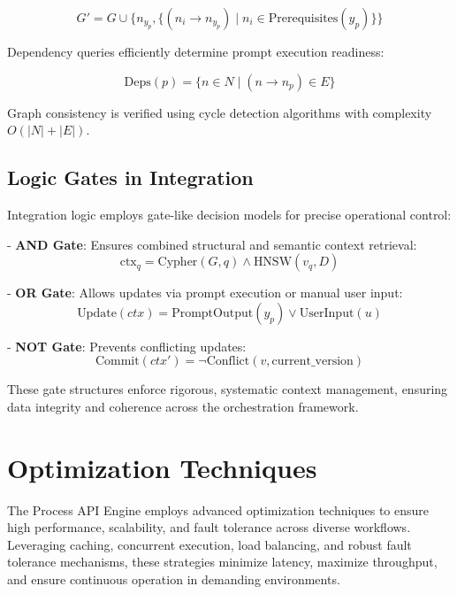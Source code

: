 \documentclass[11pt,a4paper]{article}
\begin{document}
\[
G'=G\cup\{n_{y_p},\{(n_i\rightarrow n_{y_p})\mid n_i\in\text{Prerequisites}(y_p)\}\}
\]

Dependency queries efficiently determine prompt execution readiness:

\[
\text{Deps}(p)=\{n\in N\mid(n\rightarrow n_p)\in E\}
\]

Graph consistency is verified using cycle detection algorithms with complexity \(O(|N|+|E|)\).

\subsection{Logic Gates in Integration}
\label{subsec:integration_gates}

Integration logic employs gate-like decision models for precise operational control:

- \textbf{AND Gate}: Ensures combined structural and semantic context retrieval:
\[
\text{ctx}_q=\text{Cypher}(G,q)\land\text{HNSW}(v_q,D)
\]

- \textbf{OR Gate}: Allows updates via prompt execution or manual user input:
\[
\text{Update}(ctx)=\text{PromptOutput}(y_p)\lor\text{UserInput}(u)
\]

- \textbf{NOT Gate}: Prevents conflicting updates:
\[
\text{Commit}(ctx')=\neg\text{Conflict}(v,\text{current\_version})
\]

These gate structures enforce rigorous, systematic context management, ensuring data integrity and coherence across the orchestration framework.

\section{Optimization Techniques}
\label{sec:optimization}

The Process API Engine employs advanced optimization techniques to ensure high performance, scalability, and fault tolerance across diverse workflows. Leveraging caching, concurrent execution, load balancing, and robust fault tolerance mechanisms, these strategies minimize latency, maximize throughput, and ensure continuous operation in demanding environments.
\end{document}
